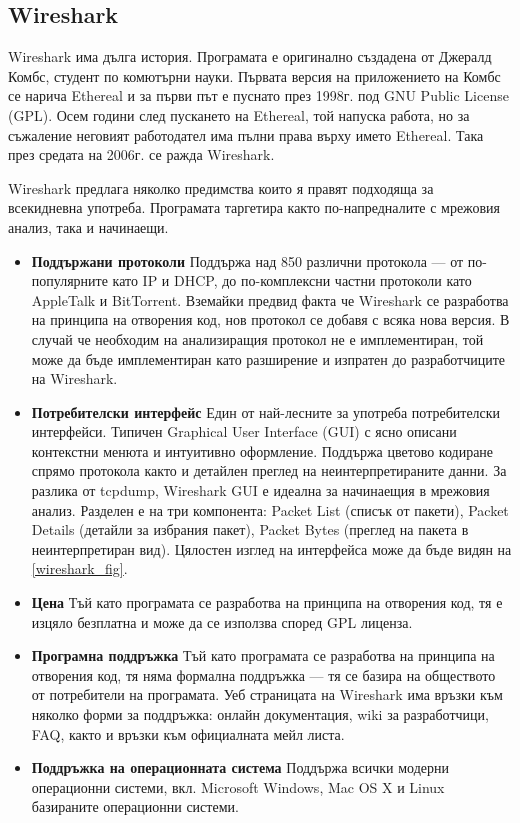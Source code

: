 \documentclass[12pt,a4paper,oneside]{book}
\begin{document}
\subsection{Wireshark}

Wireshark има дълга история. Програмата е оригинално създадена от Джералд Комбс,
студент по комютърни науки. Първата версия на приложението на Комбс се нарича
Ethereal и за първи път е пуснато през 1998г. под GNU Public License (GPL).  Осем
години след пускането на Ethereal, той напуска работа, но за съжаление
неговият работодател има пълни права върху името Ethereal. Така през средата на
2006г. се ражда Wireshark.

Wireshark предлага няколко предимства които я правят подходяща за всекидневна
употреба. Програмата таргетира както по-напредналите с мрежовия анализ, така и
начинаещи.

\begin{itemize}
  \item \textbf{Поддържани протоколи} Поддържа над 850 различни протокола --- от
    по-популярните като IP и DHCP, до по-комплексни частни протоколи като
    AppleTalk и BitTorrent. Вземайки предвид факта че Wireshark се разработва на
    принципа на отворения код, нов протокол се добавя с всяка нова версия. В
    случай че необходим на анализиращия протокол не е имплементиран, той може да
    бъде имплементиран като разширение и изпратен до разработчиците на
    Wireshark.
  \item \textbf{Потребителски интерфейс} Един от най-лесните за употреба
    потребителски интерфейси. Типичен Graphical User Interface (GUI) с ясно
    описани контекстни менюта и интуитивно оформление. Поддържа цветово кодиране
    спрямо протокола както и детайлен преглед на неинтерпретираните данни. За
    разлика от tcpdump, Wireshark GUI е идеална за начинаещия в мрежовия анализ.
    Разделен е на три компонента: Packet List (списък от пакети),
    Packet Details (детайли за избрания пакет), Packet Bytes (преглед на пакета
    в неинтерпретиран вид). Цялостен изглед на интерфейса може да бъде видян на
    \autoref{wireshark_fig}.
  \item \textbf{Цена} Тъй като програмата се разработва на принципа на отворения
    код, тя е изцяло безплатна и може да се използва според GPL лиценза.
  \item \textbf{Програмна поддръжка} Тъй като програмата се разработва на
    принципа на отворения код, тя няма формална поддръжка --- тя се
    базира на обществото от потребители на програмата. Уеб страницата на
    Wireshark има връзки към няколко форми за поддръжка: онлайн документация,
    wiki за разработчици, FAQ, както и връзки към официалната мейл листа.
  \item \textbf{Поддръжка на операционната система} Поддържа всички модерни
    операционни системи, вкл. Microsoft Windows, Mac OS X и Linux базираните
    операционни системи.
\end{itemize}
\end{document}
